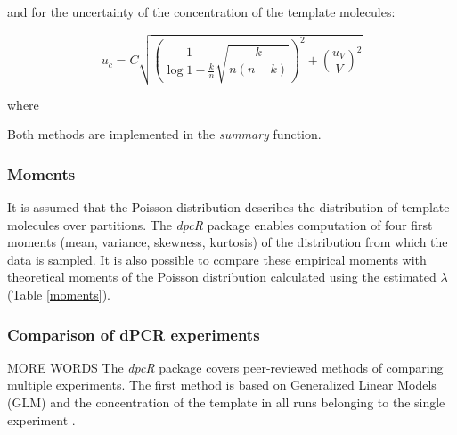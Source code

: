 \documentclass[a4,center,fleqn]{NAR}
\begin{document}
and for the uncertainty of the concentration of the template molecules:

\begin{equation}
u_{c} = C \sqrt{ \left( \frac{1}{\log{1 - \frac{k}{n} }} 
\sqrt{\frac{k}{n (n - k)}} \right)^2 
+ \left( \frac{u_V}{V} \right)^2}
\end{equation}

where

Both methods are implemented in the \textit{summary} function.

\subsubsection{Moments}

\begin{table}[b]
 {}
\end{table}

It is assumed that the Poisson distribution describes the distribution of 
template molecules over partitions. The \textit{dpcR} package enables 
computation of four first moments (mean, variance, skewness, kurtosis) of the 
distribution from which the data is sampled. It is also possible to compare 
these empirical moments with theoretical moments of the Poisson distribution 
calculated using the estimated $\lambda$ (Table \ref{moments}).

\subsubsection{Comparison of dPCR experiments}
MORE WORDS
The \textit{dpcR} package covers peer-reviewed methods of comparing 
multiple experiments. The first method is based on Generalized Linear Models 
(GLM) and the concentration of the template in all runs belonging to the single 
experiment \cite{dorazio_statistical_2015}. 
\end{document}
